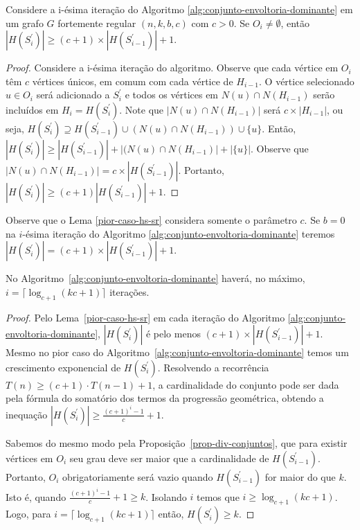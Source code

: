 \begin{lemma}
Considere a i-ésima iteração do Algoritmo \ref{alg:conjunto-envoltoria-dominante} em um grafo $G$ fortemente regular $(n,k,b,c)$ com $c>0$. Se $O_i \neq \emptyset$, então $|H(S^\prime_i)|\geq (c+1) \times |H(S^\prime_{i-1})|+1$.
\label{pior-caso-hs-sr}
\end{lemma}
\begin{proof}
Considere a i-ésima iteração do algoritmo. Observe que cada vértice em $O_{i}$ têm $c$ vértices únicos, em comum com cada vértice de $H_{i-1}$. O vértice selecionado $u \in O_{i}$ será adicionado a $S^\prime_{i}$ e todos os vértices em $N(u) \cap N(H_{i-1})$ serão incluídos em $H_{i}=H(S^\prime_i)$. Note que $|N(u) \cap N(H_{i-1})|$ será $c \times |H_{i-1}|$, ou seja, $H(S^\prime_i) \supseteq H(S^\prime_{i-1}) \cup (N(u) \cap N(H_{i-1})) \cup \{u\}$. Então, $|H(S^\prime_i)| \geq |H(S^\prime_{i-1})| + |(N(u) \cap N(H_{i-1})| + |\{u\}|$. Observe que $|N(u) \cap N(H_{i-1})| = c \times |H(S^\prime_{i-1})|$. Portanto, $|H(S^\prime_i)| \ge (c+1)|H(S^\prime_{i-1})| +1$.
\end{proof}

Observe que o Lema \ref{pior-caso-hs-sr} considera somente o parâmetro $c$. Se $b=0$ na $i$-ésima iteração do Algoritmo \ref{alg:conjunto-envoltoria-dominante} teremos $|H(S^\prime_i)| = (c+1) \times |H(S^\prime_{i-1})|+1$.

\begin{proposition}
No Algoritmo~\ref{alg:conjunto-envoltoria-dominante} haverá, no máximo, $i=\big \lceil \log_{c+1}(kc+1) \big \rceil$ iterações.
\label{max-itera-sr}
\end{proposition}
\begin{proof}
Pelo Lema~\ref{pior-caso-hs-sr} em cada iteração do Algoritmo \ref{alg:conjunto-envoltoria-dominante}, $|H(S^\prime_i)|$ é pelo menos $(c+1) \times |H(S^\prime_{i-1})|+1$.
Mesmo no pior caso do Algoritmo~\ref{alg:conjunto-envoltoria-dominante} temos um crescimento exponencial de $H(S^\prime_i)$.
Resolvendo a recorrência $T(n) \geq (c+1) \cdot T(n-1) +1$, 
a cardinalidade do conjunto pode ser dada pela fórmula do somatório dos termos da progressão geométrica, obtendo a inequação $|H(S^\prime_i)| \geq \frac{(c+1)^i-1}{c} + 1$. 

Sabemos do mesmo modo pela Proposição~\ref{prop-div-conjuntos}, 
que para existir vértices em $O_i$ seu grau deve ser maior que a cardinalidade de $H(S^\prime_{i-1})$. Portanto, $O_i$ obrigatoriamente será vazio quando $H(S^\prime_{i-1})$ for maior do que $k$. Isto é, quando $\frac{(c+1)^i-1}{c} + 1 \geq k$. Isolando $i$ temos que $i \geq \log_{c+1}(kc+1)$. Logo, para $i=\Big\lceil \log_{c+1}(kc+1) \Big\rceil$ então, $H(S^\prime_i) \geq k$.
\end{proof}

